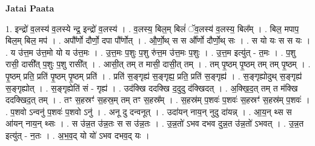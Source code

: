 \documentclass[17pt]{extarticle}
\begin{document}
\textbf{Jatai Paata} \newline

1. इन्द्रो॑ व॒लस्य॑ व॒लस्ये न्द्र॒ इन्द्रो॑ व॒लस्य॑ । . व॒लस्य॒ बिल॒म् बिलं॑ ॅव॒लस्य॑ व॒लस्य॒ बिल᳚म् । . बिल॒ मपाप॒ बिल॒म् बिल॒ मप॑ । . अपौ᳚र्णो दौर्णो॒ दपा पौ᳚र्णोत् । . औ॒र्णो॒थ् स स औ᳚र्णो दौर्णो॒थ् सः । . स यो यः स स यः । . य उ॑त्त॒म उ॑त्त॒मो यो य उ॑त्त॒मः । . उ॒त्त॒मः प॒शुः प॒शु रु॑त्त॒म उ॑त्त॒मः प॒शुः । . उ॒त्त॒म इत्यु॑त् - त॒मः । . प॒शु रासी॒ दासी᳚त् प॒शुः प॒शु रासी᳚त् । . आसी॒त् तम् त मासी॒ दासी॒त् तम् । . तम् पृ॒ष्ठम् पृ॒ष्ठम् तम् तम् पृ॒ष्ठम् । . पृ॒ष्ठम् प्रति॒ प्रति॑ पृ॒ष्ठम् पृ॒ष्ठम् प्रति॑ । . प्रति॑ स॒ङ्गृह्य॑ स॒ङ्गृह्य॒ प्रति॒ प्रति॑ स॒ङ्गृह्य॑ । . स॒ङ्गृह्योदुथ् स॒ङ्गृह्य॑ स॒ङ्गृह्योत् । . स॒ङ्गृह्येति॑ सं - गृह्य॑ । . उद॑क्खि ददक्खि द॒दुदु द॑क्खिदत् । . अ॒क्खि॒द॒त् तम् त म॑क्खि ददक्खिद॒त् तम् । . तꣳ स॒हस्रꣳ॑ स॒हस्र॒म् तम् तꣳ स॒हस्र᳚म् । . स॒हस्र॑म् प॒शवः॑ प॒शवः॑ स॒हस्रꣳ॑ स॒हस्र॑म् प॒शवः॑ । . प॒शवो ऽन्वनु॑ प॒शवः॑ प॒शवो ऽनु॑ । . अनू दु दन्वनूत् । . उदा॑यन् नाय॒न् नुदु दा॑यन्न् । . आ॒य॒न् थ्स स आ॑यन् नाय॒न् थ्सः । . स उ॑न्न॒त उ॑न्न॒तः स स उ॑न्न॒तः । . उ॒न्न॒तो॑ ऽभव दभव दुन्न॒त उ॑न्न॒तो॑ ऽभवत् । . उ॒न्न॒त इत्यु॑त् - न॒तः । . अ॒भ॒व॒द् यो यो॑ ऽभव दभव॒द् यः । \newline
\end{document}
